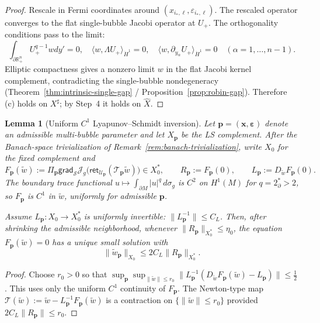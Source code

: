 \documentclass[11pt,reqno,a4paper]{amsart}
\numberwithin{equation}{section}
\theoremstyle{plain}
\newtheorem{lemma}[theorem]{Lemma}
\theoremstyle{remark}
\theoremstyle{plain}
\begin{document}
\begin{proof}
Rescale in Fermi coordinates around $(x_{i_\ast,\ell},\varepsilon_{i_\ast,\ell})$.
The rescaled operator converges to the flat single-bubble Jacobi operator at $U_+$.
The orthogonality conditions pass to the limit:
\[
\int_{\partial\mathbb R^n_+}U_+^{q-1}wdy'=0,
\quad
\langle w,\Lambda U_+\rangle_{\dot H^1}=0,
\quad
\langle w,\partial_{y_\alpha}U_+\rangle_{\dot H^1}=0
\quad(\alpha=1,\dots,n-1).
\]
Elliptic compactness gives a nonzero limit $w$ in the flat Jacobi kernel complement,
contradicting the single-bubble nondegeneracy (Theorem~\ref{thm:intrinsic-single-gap}
/ Proposition~\ref{prop:robin-gap}).
Therefore (c) holds on $X^\sharp$; by Step~4 it holds on $\widehat X$.
\end{proof}


\begin{lemma}[Uniform $C^1$ Lyapunov--Schmidt inversion]\label{lem:LS-C1-inversion}
Let $\mathbf p=(\mathbf x,\boldsymbol\varepsilon)$ denote an admissible
multi-bubble parameter and let $X_{\mathbf p}$ be the LS complement.  After the
Banach-space trivialization of Remark~\ref{rem:banach-trivialization}, write
$X_0$ for the fixed complement and
\[
F_{\mathbf p}(\widetilde w)
:=
\Pi_{\mathbf p}\mathsf{grad}_{\mathcal S}
\mathcal J_g\bigl(\mathsf{ret}_{\mathcal U_{\mathbf p}}
(\mathcal T_{\mathbf p}\widetilde w)\bigr)
\in X_0^\ast,
\qquad
R_{\mathbf p}:=F_{\mathbf p}(0),
\qquad
L_{\mathbf p}:=D_{\widetilde w}F_{\mathbf p}(0).
\]
The boundary trace functional $u\mapsto\int_{\partial M}|u|^q\,d\sigma_g$ is
$C^2$ on $H^1(M)$ for $q=2^*_\partial>2$, so $F_{\mathbf p}$ is $C^1$ in
$\widetilde w$, uniformly for admissible $\mathbf p$.

Assume $L_{\mathbf p}:X_0\to X_0^\ast$ is uniformly invertible:
$\|L_{\mathbf p}^{-1}\|\le C_L$.
Then, after shrinking the admissible neighborhood, whenever
$\|R_{\mathbf p}\|_{X_0^\ast}\le\eta_0$, the equation
$F_{\mathbf p}(\widetilde w)=0$ has a unique small solution with
\begin{equation}\label{eq:LS-C1-size}
\|\widetilde w_{\mathbf p}\|_{X_0}
\le 2C_L\|R_{\mathbf p}\|_{X_0^\ast}.
\end{equation}
\end{lemma}

\begin{proof}
Choose $r_0>0$ so that
$\sup_{\mathbf p}\sup_{\|\widetilde w\|\le r_0}
\|L_{\mathbf p}^{-1}(D_{\widetilde w}F_{\mathbf p}(\widetilde w)-L_{\mathbf p})\|
\le\frac12$.
This uses only the uniform $C^1$ continuity of $F_{\mathbf p}$.
The Newton-type map
$\mathcal T(\widetilde w):=\widetilde w-L_{\mathbf p}^{-1}F_{\mathbf p}(\widetilde w)$
is a contraction on $\{\|\widetilde w\|\le r_0\}$ provided
$2C_L\|R_{\mathbf p}\|\le r_0$.
\end{proof}
\end{document}
